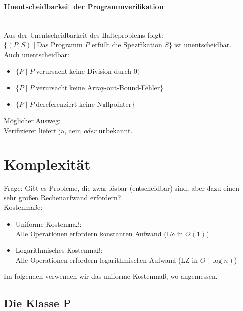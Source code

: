 \documentclass{scrreprt}
\begin{document}
\subsubsection{Unentscheidbarkeit der Programmverifikation}
\\
Aus der Unentscheidbarkeit des Halteproblems folgt:\\
$\{ (P,S) \; | \; $Das Programm $P$ erfüllt die Spezifikation $S\}$ ist unentscheidbar.\\
Auch unentscheidbar:
\begin{itemize}
\item $\{P\;|\;P$ verursacht keine Division durch $0\}$
\item $\{P\;|\;P$ verursacht keine Array-out-Bound-Fehler$\}$
\item $\{P\;|\;P$ dereferenziert keine Nullpointer$\}$
\end{itemize}
Möglicher Ausweg:\\
Verifizierer liefert ja, nein \emph{oder} unbekannt.

\chapter{Komplexität}
Frage: Gibt es Probleme, die zwar lösbar (entscheidbar) sind, aber dazu einen sehr großen Rechenaufwand erfordern?\medskip\\
Kostenmaße:
\begin{itemize}
\item Uniforme Kostenmaß:\\
Alle Operationen erfordern konstanten Aufwand (LZ in $O(1)$)
\item Logarithmisches Kostenmaß:\\
Alle Operationen erfordern logarithmischen Aufwand (LZ in $O(\log n)$)
\end{itemize}
Im folgenden verwenden wir das uniforme Kostenmaß, wo angemessen.

\section{Die Klasse P}
\end{document}
